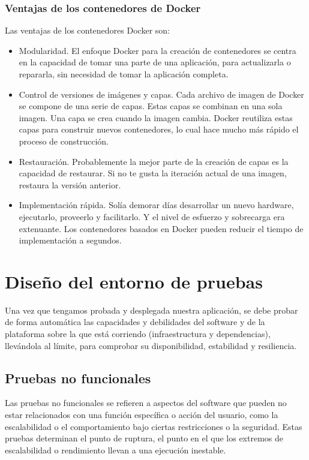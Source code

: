\subsubsection{Ventajas de los contenedores de Docker}

Las ventajas de los contenedores Docker son:

\begin{itemize}
  \item Modularidad. El enfoque Docker para la creación de contenedores se centra en la capacidad de tomar una parte de una aplicación, para actualizarla o repararla, sin necesidad de tomar la aplicación completa.
  \item Control de versiones de imágenes y capas. Cada archivo de imagen de Docker se compone de una serie de capas. Estas capas se combinan en una sola imagen. Una capa se crea cuando la imagen cambia. Docker reutiliza estas capas para construir nuevos contenedores, lo cual hace mucho más rápido el proceso de construcción.
  \item Restauración. Probablemente la mejor parte de la creación de capas es la capacidad de restaurar. Si no te gusta la iteración actual de una imagen, restaura la versión anterior.
  \item Implementación rápida. Solía demorar días desarrollar un nuevo hardware, ejecutarlo, proveerlo y facilitarlo. Y el nivel de esfuerzo y sobrecarga era extenuante. Los contenedores basados en Docker pueden reducir el tiempo de implementación a segundos.
\end{itemize}

\section{Diseño del entorno de pruebas}

Una vez que tengamos probada y desplegada nuestra aplicación, se debe probar de forma automática las capacidades y debilidades del software y de la plataforma sobre la que está corriendo (infraestructura y dependencias), llevándola al límite, para comprobar su disponibilidad, estabilidad y resiliencia.

\subsection{Pruebas no funcionales}

Las pruebas no funcionales se refieren a aspectos del software que pueden no estar relacionados con una función específica o acción del usuario, como la escalabilidad o el comportamiento bajo ciertas restricciones o la seguridad. Estas pruebas determinan el punto de ruptura, el punto en el que los extremos de escalabilidad o rendimiento llevan a una ejecución inestable.

